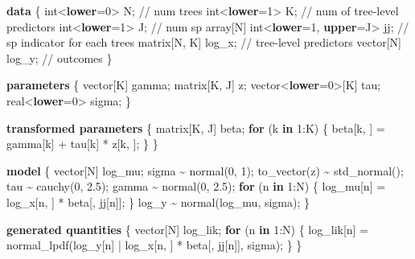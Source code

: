 \documentclass[
  12pt,
  letterpaper,
  DIV=11,
  numbers=noendperiod]{scrartcl}
\newenvironment{Shaded}{\begin{snugshade}}{\end{snugshade}}
\newcommand{\CommentTok}[1]{\textcolor[rgb]{0.37,0.37,0.37}{#1}}
\newcommand{\ControlFlowTok}[1]{\textcolor[rgb]{0.00,0.23,0.31}{\textbf{#1}}}
\newcommand{\DataTypeTok}[1]{\textcolor[rgb]{0.68,0.00,0.00}{#1}}
\newcommand{\DecValTok}[1]{\textcolor[rgb]{0.68,0.00,0.00}{#1}}
\newcommand{\FloatTok}[1]{\textcolor[rgb]{0.68,0.00,0.00}{#1}}
\newcommand{\KeywordTok}[1]{\textcolor[rgb]{0.00,0.23,0.31}{\textbf{#1}}}
\newcommand{\NormalTok}[1]{\textcolor[rgb]{0.00,0.23,0.31}{#1}}
\begin{document}
\begin{Shaded}
\begin{Highlighting}[]
\KeywordTok{data}\NormalTok{ \{}
  \DataTypeTok{int}\NormalTok{\textless{}}\KeywordTok{lower}\NormalTok{=}\DecValTok{0}\NormalTok{\textgreater{} N;                    }\CommentTok{// num trees}
  \DataTypeTok{int}\NormalTok{\textless{}}\KeywordTok{lower}\NormalTok{=}\DecValTok{1}\NormalTok{\textgreater{} K;                    }\CommentTok{// num of tree{-}level predictors}
  \DataTypeTok{int}\NormalTok{\textless{}}\KeywordTok{lower}\NormalTok{=}\DecValTok{1}\NormalTok{\textgreater{} J;                    }\CommentTok{// num sp}
  \DataTypeTok{array}\NormalTok{[N] }\DataTypeTok{int}\NormalTok{\textless{}}\KeywordTok{lower}\NormalTok{=}\DecValTok{1}\NormalTok{, }\KeywordTok{upper}\NormalTok{=J\textgreater{} jj; }\CommentTok{// sp indicator for each trees}
  \DataTypeTok{matrix}\NormalTok{[N, K] log\_x;                }\CommentTok{// tree{-}level predictors}
  \DataTypeTok{vector}\NormalTok{[N] log\_y;                   }\CommentTok{// outcomes}
\NormalTok{\}}

\KeywordTok{parameters}\NormalTok{ \{}
  \DataTypeTok{vector}\NormalTok{[K] gamma;}
  \DataTypeTok{matrix}\NormalTok{[K, J] z;}
  \DataTypeTok{vector}\NormalTok{\textless{}}\KeywordTok{lower}\NormalTok{=}\DecValTok{0}\NormalTok{\textgreater{}[K] tau;}
  \DataTypeTok{real}\NormalTok{\textless{}}\KeywordTok{lower}\NormalTok{=}\DecValTok{0}\NormalTok{\textgreater{} sigma;}
\NormalTok{\}}

\KeywordTok{transformed parameters}\NormalTok{ \{}
  \DataTypeTok{matrix}\NormalTok{[K, J] beta;}
  \ControlFlowTok{for}\NormalTok{ (k }\ControlFlowTok{in} \DecValTok{1}\NormalTok{:K) \{}
\NormalTok{    beta[k, ] = gamma[k] + tau[k] * z[k, ];}
\NormalTok{  \}}
\NormalTok{\}}

\KeywordTok{model}\NormalTok{ \{}
  \DataTypeTok{vector}\NormalTok{[N] log\_mu;}
\NormalTok{  sigma \textasciitilde{} normal(}\DecValTok{0}\NormalTok{, }\DecValTok{1}\NormalTok{);}
\NormalTok{  to\_vector(z) \textasciitilde{} std\_normal();}
\NormalTok{  tau \textasciitilde{} cauchy(}\DecValTok{0}\NormalTok{, }\FloatTok{2.5}\NormalTok{);}
\NormalTok{  gamma \textasciitilde{} normal(}\DecValTok{0}\NormalTok{, }\FloatTok{2.5}\NormalTok{);}
  \ControlFlowTok{for}\NormalTok{ (n }\ControlFlowTok{in} \DecValTok{1}\NormalTok{:N) \{}
\NormalTok{    log\_mu[n] = log\_x[n, ] * beta[, jj[n]];}
\NormalTok{  \}}
\NormalTok{  log\_y \textasciitilde{} normal(log\_mu, sigma);}
\NormalTok{\}}

\KeywordTok{generated quantities}\NormalTok{ \{}
  \DataTypeTok{vector}\NormalTok{[N] log\_lik;}
  \ControlFlowTok{for}\NormalTok{ (n }\ControlFlowTok{in} \DecValTok{1}\NormalTok{:N) \{}
\NormalTok{    log\_lik[n] = normal\_lpdf(log\_y[n] | log\_x[n, ] * beta[, jj[n]], sigma);}
\NormalTok{  \}}
\NormalTok{\}}
\end{Highlighting}
\end{Shaded}
\end{document}
